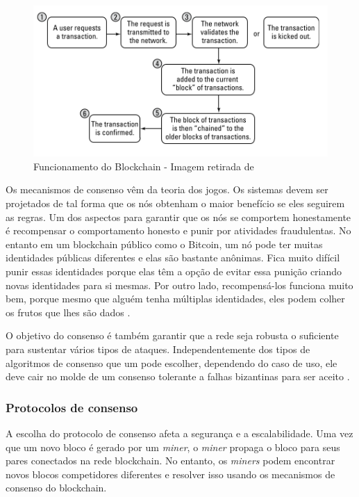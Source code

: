         
                \begin{figure}[H]
                     \centering
                     \includegraphics[scale=0.7]{figuras/capitulo_2/blockchain_come_to_agreement.png}
                     \caption{Funcionamento do Blockchain - Imagem retirada de \cite{blockchain_for_dummies}}
                     \label{fig:blockchain_work_dummies}
                \end{figure}
        
        Os mecanismos de consenso vêm da teoria dos jogos. Os sistemas devem ser projetados de tal forma que os nós obtenham o maior benefício se eles seguirem as regras. Um dos aspectos para garantir que os nós se comportem honestamente é recompensar o comportamento honesto e punir por atividades fraudulentas. No entanto em um blockchain público como o Bitcoin, um nó pode ter muitas identidades públicas diferentes e elas são bastante anônimas. Fica muito difícil punir essas identidades porque elas têm a opção de evitar essa punição criando novas identidades para si mesmas. Por outro lado, recompensá-los funciona muito bem, porque mesmo que alguém tenha múltiplas identidades, eles podem colher os frutos que lhes são dados \cite{beginnig_blockchain_bikramaditya}.
        
        O objetivo do consenso é também garantir que a rede seja robusta o suficiente para sustentar vários tipos de ataques. Independentemente dos tipos de algoritmos de consenso que um pode escolher, dependendo do caso de uso, ele deve cair no molde de um consenso tolerante a falhas bizantinas para ser aceito \cite{beginnig_blockchain_bikramaditya}.
        
        
        \subsubsection{Protocolos de consenso}

            A escolha do protocolo de consenso afeta a segurança e a escalabilidade. Uma vez que um novo bloco é gerado por um \textit{miner}, o \textit{miner} propaga o bloco para seus pares conectados na rede blockchain. No entanto, os \textit{miners} podem encontrar novos blocos competidores diferentes e resolver isso usando os mecanismos de consenso do blockchain.\cite{architecture_for_blockchain}
            
